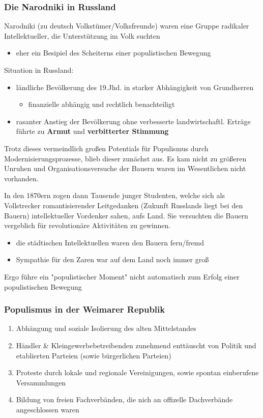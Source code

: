 \documentclass[11pt]{article}
\begin{document}
\subsubsection{Die Narodniki in Russland}
\label{sec:org292970a}
Narodniki (zu deutsch Volkstümer/Volksfreunde) waren eine Gruppe radikaler Intellektueller, die Unterstützung im Volk suchten
\begin{itemize}
\item eher ein Besipiel des Scheiterns einer populistischen Bewegung
\end{itemize}

Situation in Russland:
\begin{itemize}
\item ländliche Bevölkerung des 19.Jhd. in starker Abhängigkeit von Grundherren
\begin{itemize}
\item finanzielle abhängig und rechtlich benachteiligt
\end{itemize}
\item rasanter Anstieg der Bevölkerung ohne verbesserte landwirtschaftl. Erträge führte zu \textbf{Armut} und \textbf{verbitterter Stimmung}
\end{itemize}

Trotz dieses vermeindlich großen Potentials für Populismus durch Modernisierungsprozesse, blieb dieser zunächst aus. Es kam nicht zu größeren Unruhen und Organisationsversuche der Bauern waren im Wesentlichen nicht vorhanden.

In den 1870ern zogen dann Tausende junger Studenten, welche sich als Vollstrecker romantisierender Leitgedanken (Zukunft Russlands liegt bei den Bauern) intellektueller Vordenker sahen, aufs Land. Sie versuchten die Bauern vergeblich für revolutionäre Aktivitäten zu gewinnen.
\begin{itemize}
\item die städtischen Intellektuellen waren den Bauern fern/fremd
\item Sympathie für den Zaren war auf dem Land noch immer groß
\end{itemize}

Ergo führe ein "populistischer Moment" nicht automatisch zum Erfolg einer populistischen Bewegung
\subsubsection{Populismus in der Weimarer Republik}
\label{sec:orge40cb29}
\begin{enumerate}
\item Abhängung und soziale Isolierung des alten Mittelstandes
\item Händler \& Kleingewerbebetreibenden zunehmend enttäuscht von Politik und etablierten Parteien (sowie bürgerlichen Parteien)
\item Proteste durch lokale und regionale Vereinigungen, sowie spontan einberufene Versammlungen
\item Bildung von freien Fachverbänden, die nich an offizelle Dachverbände angeschlossen waren
\end{enumerate}
\end{document}
